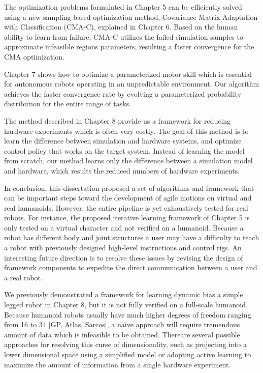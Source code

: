 The optimization problems formulated in Chapter 5 can be efficiently solved
using a new sampling-based optimization method, Covariance Matrix
Adaptation with Classification (CMA-C), explained in Chapter 6.
Based on the human ability to learn from failure,
CMA-C utilizes the failed simulation samples to approximate infeasible regions
parameters, resulting a faster convergence for the CMA
optimization.

Chapter 7 shows how to optimize a parameterized motor skill which
is essential for autonomous robots operating in an unpredictable environment.
Our algorithm achieves the faster convergence rate by evolving a parameterized
probability distribution for the entire range of tasks.

The method described in Chapter 8 provide us a framework for reducing hardware
experiments which is often very costly.
The goal of this method is to learn the difference between simulation and
hardware systems, and optimize control policy that works on the target system.
Instead of learning the model from scratch, our method learns only the
difference between a simulation model and hardware, which results the reduced
numbers of hardware experiments.

In conclusion, this dissertation proposed a set of algorithms and framework
that can be important steps toward the development of agile motions on virtual
and real humanoids.
However, the entire pipeline is yet exhaustively tested for real robots.
For instance, the proposed iterative learning framework of Chapter 5 is only
tested on a virtual character and not verified on a humanoid.
Because a robot has different body and joint structures
a user may have a difficulty to teach a robot with previously
designed high-level instructions and control rigs.
An interesting future direction is to resolve these issues by revising
the design of framework components to expedite the direct communication
between a user and a real robot.

We previously demonstrated a framework for learning dynamic bias
a simple legged robot in Chapter 8, but it is not fully verified on a
full-scale humanoid.
Because humanoid robots usually have much higher degrees of freedom ranging
from 16 to 34 [GP, Atlas, Sarcos], a na\"{\i}ve approach will require
tremendous amount of data which is infeasible to be obtained.
Thereare several possible approaches for resolving this curse of
dimensionality, such as projecting into a lower dimensional space using a
simplified model or adopting active learning to maximize the amount of
information from a single hardware experiment.












